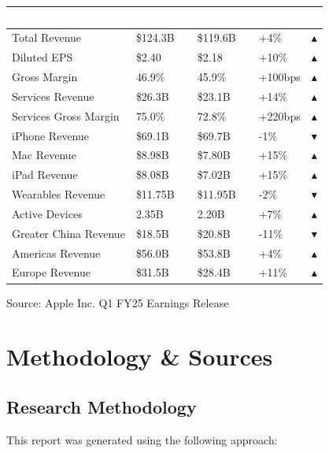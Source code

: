 \documentclass[11pt,a4paper]{article}
\newcommand{\kpiup}{\textcolor{msgreen}{$\blacktriangle$}}
\newcommand{\kpidown}{\textcolor{msred}{$\blacktriangledown$}}
\begin{document}
\begin{center}
\begin{tabular}{L{4.5cm}R{2cm}R{2cm}R{2cm}C{1cm}}
\toprule
{}
\textcolor{white}{\textbf{KPI}} & \textcolor{white}{\textbf{Q1 FY25}} & \textcolor{white}{\textbf{Q1 FY24}} & \textcolor{white}{\textbf{YoY}} & \textcolor{white}{\textbf{}} \\
\midrule
Total Revenue & \$124.3B & \$119.6B & +4\% & \kpiup \\
Diluted EPS & \$2.40 & \$2.18 & +10\% & \kpiup \\
Gross Margin & 46.9\% & 45.9\% & +100bps & \kpiup \\
Services Revenue & \$26.3B & \$23.1B & +14\% & \kpiup \\
Services Gross Margin & 75.0\% & 72.8\% & +220bps & \kpiup \\
iPhone Revenue & \$69.1B & \$69.7B & -1\% & \kpidown \\
Mac Revenue & \$8.98B & \$7.80B & +15\% & \kpiup \\
iPad Revenue & \$8.08B & \$7.02B & +15\% & \kpiup \\
Wearables Revenue & \$11.75B & \$11.95B & -2\% & \kpidown \\
Active Devices & 2.35B & 2.20B & +7\% & \kpiup \\
Greater China Revenue & \$18.5B & \$20.8B & -11\% & \kpidown \\
Americas Revenue & \$56.0B & \$53.8B & +4\% & \kpiup \\
Europe Revenue & \$31.5B & \$28.4B & +11\% & \kpiup \\
\bottomrule
\end{tabular}
\end{center}

\vspace{6pt}
\textcolor{msgray}{\scriptsize Source: Apple Inc. Q1 FY25 Earnings Release}

\section{Methodology \& Sources}

\subsection{Research Methodology}

This report was generated using the following approach:
\end{document}
